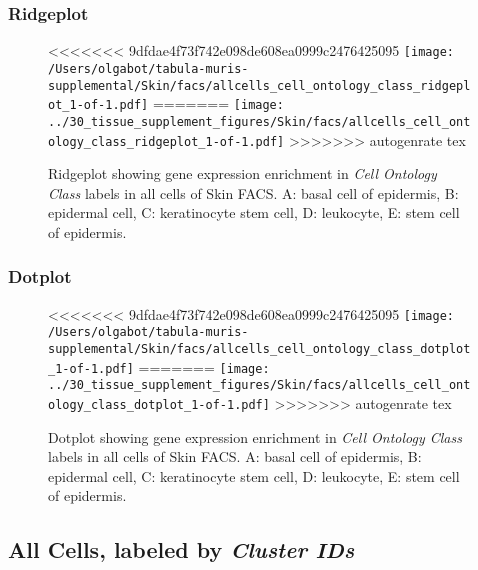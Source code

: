 \subsubsection{Ridgeplot}
\begin{figure}[h]
\centering
<<<<<<< 9dfdae4f73f742e098de608ea0999c2476425095
\texttt{[image: /Users/olgabot/tabula-muris-supplemental/Skin/facs/allcells\_cell\_ontology\_class\_ridgeplot\_1-of-1.pdf]}
=======
\texttt{[image: ../30\_tissue\_supplement\_figures/Skin/facs/allcells\_cell\_ontology\_class\_ridgeplot\_1-of-1.pdf]}
>>>>>>> autogenrate tex

\caption{ Ridgeplot  showing gene expression enrichment in \emph{Cell Ontology Class} labels in all cells of Skin FACS. A: basal cell of epidermis, B: epidermal cell, C: keratinocyte stem cell, D: leukocyte, E: stem cell of epidermis.}
\end{figure}


\clearpage

\subsubsection{Dotplot}
\begin{figure}[h]
\centering
<<<<<<< 9dfdae4f73f742e098de608ea0999c2476425095
\texttt{[image: /Users/olgabot/tabula-muris-supplemental/Skin/facs/allcells\_cell\_ontology\_class\_dotplot\_1-of-1.pdf]}
=======
\texttt{[image: ../30\_tissue\_supplement\_figures/Skin/facs/allcells\_cell\_ontology\_class\_dotplot\_1-of-1.pdf]}
>>>>>>> autogenrate tex

\caption{ Dotplot  showing gene expression enrichment in \emph{Cell Ontology Class} labels in all cells of Skin FACS. A: basal cell of epidermis, B: epidermal cell, C: keratinocyte stem cell, D: leukocyte, E: stem cell of epidermis.}
\end{figure}


\clearpage

\subsection{All Cells, labeled by \emph{Cluster IDs}}
